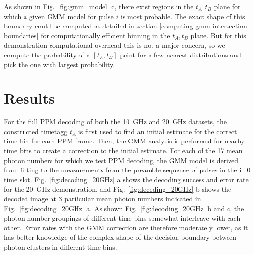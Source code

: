 \documentclass[11pt]{caltech_thesis} %
\begin{document}
As shown in Fig.~\ref{fig:gmm_model} c, there exist regions in the $t_A, t_B$ plane for which a given GMM model for pulse $i$ is most probable. The exact shape of this boundary could be computed as detailed in section \ref{computing-gmm-intersection-boundaries} for computationally efficient binning in the $t_A, t_B$ plane. But for this demonstration computational overhead this is not a major concern, so we compute the probability of a $[t_A, t_B]$ point for a few nearest distributions and pick the one with largest probability.

\hypertarget{results-1}{%
\section{Results}\label{results-1}}

For the full PPM decoding of both the 10~GHz and 20~GHz datasets, the constructed timetagg $\tilde{t_A}$ is first used to find an initial estimate for the correct time bin for each PPM frame. Then, the GMM analysis is performed for nearby time bins to create a correction to the initial estimate. For each of the 17 mean photon numbers for which we test PPM decoding, the GMM model is derived from fitting to the measurements from the preamble sequence of pulses in the i=0 time slot. Fig.~\ref{fig:decoding_20GHz} a shows the decoding success and error rate for the 20~GHz demonstration, and
Fig.~\ref{fig:decoding_20GHz} b shows the decoded image at 3 particular mean photon numbers indicated in Fig.~\ref{fig:decoding_20GHz} a. As shown Fig.~\ref{fig:decoding_20GHz} b and c, the photon number groupings of different time bins somewhat interleave with each other. Error rates with the GMM correction are therefore moderately lower, as it has better knowledge of the complex shape of the decision boundary between photon clusters in different time bins.
\end{document}
